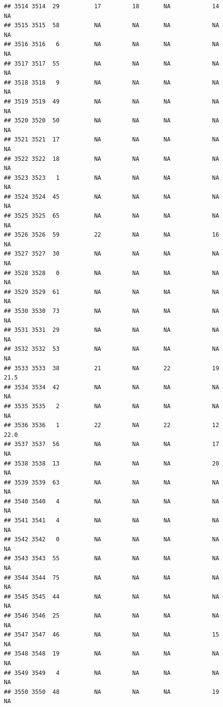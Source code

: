\documentclass[man]{apa6}
\begin{document}
\begin{verbatim}
## 3514 3514  29          17         18       NA            14       NA
## 3515 3515  58          NA         NA       NA            NA       NA
## 3516 3516   6          NA         NA       NA            NA       NA
## 3517 3517  55          NA         NA       NA            NA       NA
## 3518 3518   9          NA         NA       NA            NA       NA
## 3519 3519  49          NA         NA       NA            NA       NA
## 3520 3520  50          NA         NA       NA            NA       NA
## 3521 3521  17          NA         NA       NA            NA       NA
## 3522 3522  18          NA         NA       NA            NA       NA
## 3523 3523   1          NA         NA       NA            NA       NA
## 3524 3524  45          NA         NA       NA            NA       NA
## 3525 3525  65          NA         NA       NA            NA       NA
## 3526 3526  59          22         NA       NA            16       NA
## 3527 3527  30          NA         NA       NA            NA       NA
## 3528 3528   0          NA         NA       NA            NA       NA
## 3529 3529  61          NA         NA       NA            NA       NA
## 3530 3530  73          NA         NA       NA            NA       NA
## 3531 3531  29          NA         NA       NA            NA       NA
## 3532 3532  53          NA         NA       NA            NA       NA
## 3533 3533  38          21         NA       22            19     21.5
## 3534 3534  42          NA         NA       NA            NA       NA
## 3535 3535   2          NA         NA       NA            NA       NA
## 3536 3536   1          22         NA       22            12     22.0
## 3537 3537  56          NA         NA       NA            17       NA
## 3538 3538  13          NA         NA       NA            20       NA
## 3539 3539  63          NA         NA       NA            NA       NA
## 3540 3540   4          NA         NA       NA            NA       NA
## 3541 3541   4          NA         NA       NA            NA       NA
## 3542 3542   0          NA         NA       NA            NA       NA
## 3543 3543  55          NA         NA       NA            NA       NA
## 3544 3544  75          NA         NA       NA            NA       NA
## 3545 3545  44          NA         NA       NA            NA       NA
## 3546 3546  25          NA         NA       NA            NA       NA
## 3547 3547  46          NA         NA       NA            15       NA
## 3548 3548  19          NA         NA       NA            NA       NA
## 3549 3549   4          NA         NA       NA            NA       NA
## 3550 3550  48          NA         NA       NA            19       NA

\end{verbatim}
\end{document}
